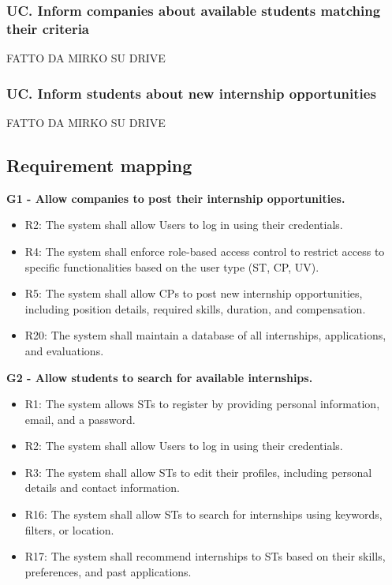 \subsubsection*{UC\cuc . Inform companies about available students matching their criteria}
FATTO DA MIRKO SU DRIVE

\subsubsection*{UC\cuc . Inform students about new internship opportunities}
FATTO DA MIRKO SU DRIVE

\newpage

\subsection{Requirement mapping}
\label{subsec:requirement_mapping}%
\textbf{G1 - Allow companies to post their internship opportunities.}
\begin{itemize}
    \item R2: The system shall allow Users to log in using their credentials.
    \item R4: The system shall enforce role-based access control to restrict access to specific functionalities based on the user type (ST, CP, UV).
    \item R5: The system shall allow CPs to post new internship opportunities, including position details, required skills, duration, and compensation.
    \item R20: The system shall maintain a database of all internships, applications, and evaluations.
\end{itemize}

\vspace{1.5cm}
\textbf{G2 - Allow students to search for available internships.}
\begin{itemize}
    \item R1: The system allows STs to register by providing personal information, email, and a password.
    \item R2: The system shall allow Users to log in using their credentials.
    \item R3: The system shall allow STs to edit their profiles, including personal details and contact information.
    \item R16: The system shall allow STs to search for internships using keywords, filters, or location.
    \item R17: The system shall recommend internships to STs based on their skills, preferences, and past applications.
\end{itemize}

